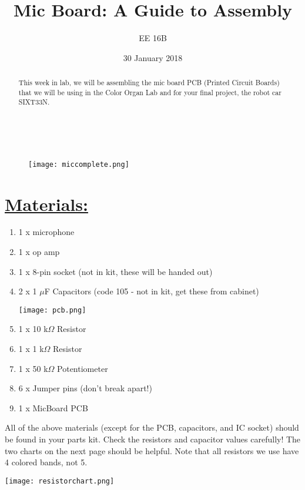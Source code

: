 \documentclass{tufte-handout}
\title{Mic Board: A Guide to Assembly}
\author[EE 16B]{EE 16B}
\date{30 January 2018}%
\begin{document}
\maketitle%
\linebreak\
\begin{abstract}
\noindent This week in lab, we will be assembling the mic board PCB (Printed Circuit Boards) that we will be using in the Color Organ Lab and for your final project, the robot car SIXT33N.
\end{abstract}
\begin{figure}
  \texttt{[image: miccomplete.png]}
  \label{fig:textfig}
\end{figure}

\section{\underline{\textbf{Materials:}}}\label{sec:page-layout}


\begin{enumerate}
    \item 1 x microphone
    \item 1 x op amp
    \item 1 x 8-pin socket (not in kit, these will be handed out)
    \item 2 x 1 $\mu$F Capacitors (code 105 - not in kit, get these from cabinet)
\begin{marginfigure}
\centering
\texttt{[image: pcb.png]}
\label{fig:marginfig}
\end{marginfigure}
    \item 1 x 10 k$\Omega$ Resistor
    \item 1 x 1 k$\Omega$ Resistor
    \item 1 x 50 k$\Omega$ Potentiometer
    \item 6 x Jumper pins (don't break apart!)
    \item 1 x MicBoard PCB
\end{enumerate}

\linebreak
\noindent All of the above materials (except for the PCB, capacitors, and IC socket) should be found in your parts kit. Check the resistors and capacitor values carefully! The two charts on the next page should be helpful. Note that all resistors we use have 4 colored bands, not 5.
\begin{figure*}[h!]
  \texttt{[image: resistorchart.png]}%
  \label{fig:fullfig}%
\end{figure*}
\end{document}
